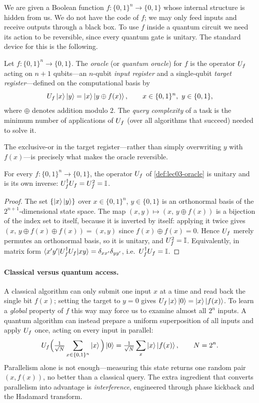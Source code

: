 We are given a Boolean function $f:\{0,1\}^n\to\{0,1\}$ whose internal structure
is hidden from us. We do not have the code of $f$; we may only feed inputs and
receive outputs through a black box. To use $f$ inside a quantum circuit we need
its action to be reversible, since every quantum gate is unitary. The standard
device for this is the following.

\begin{definition}
\label{def:lec03-oracle}
Let $f:\{0,1\}^n\to\{0,1\}$. The \emph{oracle} (or \emph{quantum oracle}) for $f$
is the operator $U_{f}$ acting on $n+1$ qubits---an $n$-qubit \emph{input register}
and a single-qubit \emph{target register}---defined on the computational basis by
\[
  U_{f}\ket{x}\ket{y}=\ket{x}\ket{y\oplus f(x)},
  \qquad x\in\{0,1\}^n,\ y\in\{0,1\},
\]
where $\oplus$ denotes addition modulo $2$. The \emph{query complexity} of a task
is the minimum number of applications of $U_{f}$ (over all algorithms that succeed)
needed to solve it.
\end{definition}

The exclusive-or in the target register---rather than simply overwriting $y$ with
$f(x)$---is precisely what makes the oracle reversible.

\begin{lemma}
\label{lem:lec03-unitary}
For every $f:\{0,1\}^n\to\{0,1\}$, the operator $U_{f}$ of
\cref{def:lec03-oracle} is unitary and is its own inverse:
$U_{f}^{\dagger}U_{f}=U_{f}^2=\mathbb{I}$.
\end{lemma}

\begin{proof}
The set $\{\ket{x}\ket{y}\}$ over $x\in\{0,1\}^n$, $y\in\{0,1\}$ is an orthonormal
basis of the $2^{n+1}$-dimensional state space. The map
$(x,y)\mapsto(x,\,y\oplus f(x))$ is a bijection of the index set to itself, because
it is inverted by itself: applying it twice gives
$(x,\,y\oplus f(x)\oplus f(x))=(x,y)$ since $f(x)\oplus f(x)=0$. Hence $U_{f}$ merely
permutes an orthonormal basis, so it is unitary, and $U_{f}^2=\mathbb{I}$. Equivalently, in
matrix form $\braket{x'y'|U_{f}^{\dagger}U_{f}|xy}=\delta_{xx'}\delta_{yy'}$, i.e.\
$U_{f}^{\dagger}U_{f}=\mathbb{I}$.
\end{proof}

\paragraph{Classical versus quantum access.}
A classical algorithm can only submit one input $x$ at a time and read back the
single bit $f(x)$; setting the target to $y=0$ gives $U_{f}\ket{x}\ket{0}=\ket{x}\ket{f(x)}$.
To learn a \emph{global} property of $f$ this way may force us to examine almost
all $2^n$ inputs. A quantum algorithm can instead prepare a uniform superposition
of all inputs and apply $U_{f}$ once, acting on every input in parallel:
\[
  U_{f}\Big(\tfrac{1}{\sqrt{N}}\sum_{x\in\{0,1\}^n}\ket{x}\Big)\ket{0}
  =\tfrac{1}{\sqrt{N}}\sum_{x}\ket{x}\ket{f(x)},
  \qquad N=2^n.
\]
Parallelism alone is not enough---measuring this state returns one random pair
$(x,f(x))$, no better than a classical query. The extra ingredient that converts
parallelism into advantage is \emph{interference}, engineered through phase
kickback and the Hadamard transform.


